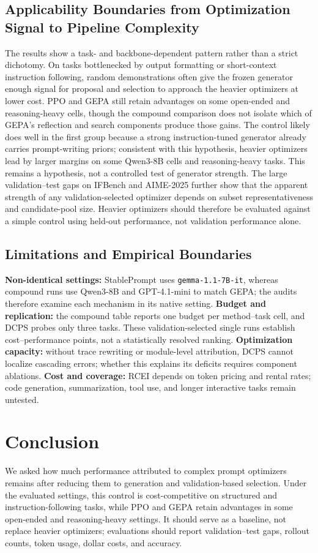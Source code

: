 \documentclass[runningheads]{llncs}
\begin{document}
\subsection{Applicability Boundaries from Optimization Signal to Pipeline Complexity}
\label{sec:discussion-scenarios}
The results show a task- and backbone-dependent pattern rather than a strict dichotomy. On tasks bottlenecked by output formatting or short-context instruction following, random demonstrations often give the frozen generator enough signal for proposal and selection to approach the heavier optimizers at lower cost. PPO and GEPA still retain advantages on some open-ended and reasoning-heavy cells, though the compound comparison does not isolate which of GEPA's reflection and search components produce those gains. The control likely does well in the first group because a strong instruction-tuned generator already carries prompt-writing priors; consistent with this hypothesis, heavier optimizers lead by larger margins on some Qwen3-8B cells and reasoning-heavy tasks. This remains a hypothesis, not a controlled test of generator strength. The large validation--test gaps on IFBench and AIME-2025 further show that the apparent strength of any validation-selected optimizer depends on subset representativeness and candidate-pool size. Heavier optimizers should therefore be evaluated against a simple control using held-out performance, not validation performance alone.

\subsection{Limitations and Empirical Boundaries}
\label{sec:discussion-limitations}
\textbf{Non-identical settings:} StablePrompt uses \texttt{gemma-1.1-7B-it}, whereas compound runs use Qwen3-8B and GPT-4.1-mini to match GEPA; the audits therefore examine each mechanism in its native setting. \textbf{Budget and replication:} the compound table reports one budget per method--task cell, and DCPS probes only three tasks. These validation-selected single runs establish cost--performance points, not a statistically resolved ranking. \textbf{Optimization capacity:} without trace rewriting or module-level attribution, DCPS cannot localize cascading errors; whether this explains its deficits requires component ablations. \textbf{Cost and coverage:} RCEI depends on token pricing and rental rates; code generation, summarization, tool use, and longer interactive tasks remain untested.

\section{Conclusion}
We asked how much performance attributed to complex prompt optimizers remains after reducing them to generation and validation-based selection. Under the evaluated settings, this control is cost-competitive on structured and instruction-following tasks, while PPO and GEPA retain advantages in some open-ended and reasoning-heavy settings. It should serve as a baseline, not replace heavier optimizers; evaluations should report validation--test gaps, rollout counts, token usage, dollar costs, and accuracy.



\end{document}
